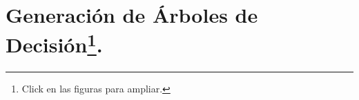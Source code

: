\documentclass{article}
\begin{document}
\pagestyle{plain}
\hypersetup{pageanchor=true}
\tableofcontents 
\listoffigures
\listoftables
\newpage
{}


\section{Generación de Árboles de Decisión\footnote{Click en las figuras para ampliar.}.}
\end{document}
